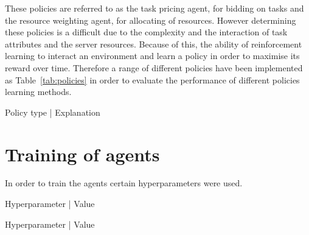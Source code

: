 These policies are referred to as the task pricing agent, for bidding on tasks and the resource weighting agent,
for allocating of resources. However determining these policies is a difficult due to the complexity and the interaction
of task attributes and the server resources. Because of this, the ability of reinforcement learning to interact
an environment and learn a policy in order to maximise its reward over time. Therefore a range of different
policies have been implemented as Table~\ref{tab:policies} in order to evaluate the performance of different policies
learning methods.

\begin{tabular}
    \begin{table}
        Policy type | Explanation \\
    \end{table}
    \label{tab:policies}
    \caption{Table of policy types}
\end{tabular}

\section{Training of agents}\label{sec:training-of-agents}
In order to train the agents certain hyperparameters were used.

\begin{tabular}
    \begin{table}
        Hyperparameter | Value \\
    \end{table}
    \label{tab:dqn_hyperparameter}
    \caption{Table of Deep Q Networks training hyperparameters}
\end{tabular}

\begin{tabular}
    \begin{table}
        Hyperparameter | Value \\
    \end{table}
    \label{tab:ddpg_hyperparameter}
    \caption{Table of Deep Deterministic Policy Gradient hyperparameters}
\end{tabular}